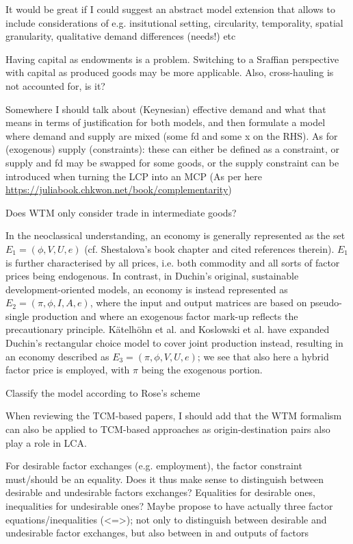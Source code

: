 It would be great if I could suggest an abstract model extension that allows to include considerations of e.g. insitutional setting, circularity, temporality, spatial granularity, qualitative demand differences (needs!) etc

Having capital as endowments is a problem. Switching to a Sraffian perspective with capital as produced goods may be more applicable.
Also, cross-hauling is not accounted for, is it?

Somewhere I should talk about (Keynesian) effective demand and what that means in terms of justification for both models, and then formulate a model where demand and supply are mixed (some fd and some x on the RHS).
As for (exogenous) supply (constraints): these can either be defined as a constraint, or supply and fd may be swapped for some goods, or the supply constraint can be introduced when turning the LCP into an MCP (As per here \url{https://juliabook.chkwon.net/book/complementarity})

Does WTM only consider trade in intermediate goods?

In the neoclassical understanding, an economy is generally represented as the set $E_{1} = (\phi, V, U, e)$ (cf. Shestalova's book chapter and cited references therein). $E_{1}$ is further characterised by all prices, i.e. both commodity and all sorts of factor prices being endogenous. In contrast, in Duchin's original, sustainable development-oriented models, an economy is instead represented as $E_{2} = (\pi, \phi, I, A, e)$, where the input and output matrices are based on pseudo-single production and where an exogenous factor mark-up reflects the precautionary principle. Kätelhöhn et al. and Koslowski et al. have expanded Duchin's rectangular choice model to cover joint production instead, resulting in an economy described as $E_{3} = (\pi, \phi, V, U, e)$; we see that also here a hybrid factor price is employed, with $\pi$ being the exogenous portion.

Classify the model according to Rose's scheme

When reviewing the TCM-based papers, I should add that the WTM formalism can also be applied to TCM-based approaches as origin-destination pairs also play a role in LCA.

For desirable factor exchanges (e.g. employment), the factor constraint must/should be an equality. Does it thus make sense to distinguish between desirable and undesirable factors exchanges? Equalities for desirable ones, inequalities for undesirable ones?
Maybe propose to have actually three factor equations/inequalities (<=>); not only to distinguish between desirable and undesirable factor exchanges, but also between in and outputs of factors

